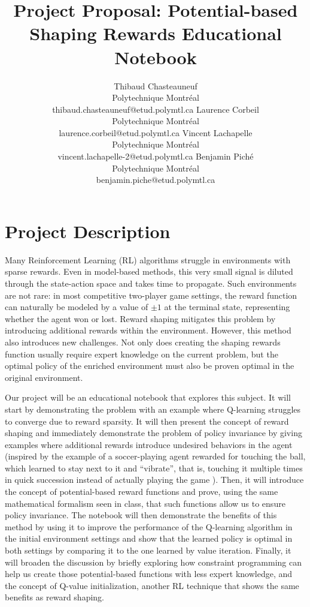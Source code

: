\documentclass{article}
\title{Project Proposal: Potential-based Shaping Rewards Educational Notebook}
\author{
  Thibaud Chasteauneuf \\ Polytechnique Montréal \\ thibaud.chasteauneuf@etud.polymtl.ca
  \And
  Laurence Corbeil \\ Polytechnique Montréal \\ laurence.corbeil@etud.polymtl.ca
  \And
  Vincent Lachapelle \\ Polytechnique Montréal \\ vincent.lachapelle-2@etud.polymtl.ca
  \And
  Benjamin Piché \\ Polytechnique Montréal \\ benjamin.piche@etud.polymtl.ca
}
\begin{document}
\maketitle


\section*{Project Description}

Many Reinforcement Learning (RL) algorithms struggle in environments with sparse rewards. Even in model-based methods, this very small signal is diluted through the state-action space and takes time to propagate. Such environments are not rare: in most competitive two-player game settings, the reward function can naturally be modeled by a value of $ \pm 1 $ at the terminal state, representing whether the agent won or lost. Reward shaping mitigates this problem by introducing additional rewards within the environment. However, this method also introduces new challenges. Not only does creating the shaping rewards function usually require expert knowledge on the current problem, but the optimal policy of the enriched environment must also be proven optimal in the original environment.

Our project will be an educational notebook that explores this subject. It will start by demonstrating the problem with an example where Q-learning struggles to converge due to reward sparsity. It will then present the concept of reward shaping and immediately demonstrate the problem of policy invariance by giving examples where additional rewards introduce undesired behaviors in the agent (inspired by the example of a soccer-playing agent rewarded for touching the ball, which learned to stay next to it and ``vibrate'', that is, touching it multiple times in quick succession instead of actually playing the game \citet{ng1999}). Then, it will introduce the concept of potential-based reward functions and prove, using the same mathematical formalism seen in class, that such functions allow us to ensure policy invariance. The notebook will then demonstrate the benefits of this method by using it to improve the performance of the Q-learning algorithm in the initial environment settings and show that the learned policy is optimal in both settings by comparing it to the one learned by value iteration. Finally, it will broaden the discussion by briefly exploring how constraint programming can help us create those potential-based functions with less expert knowledge, and the concept of Q-value initialization, another RL technique that shows the same benefits as reward shaping.
\end{document}
